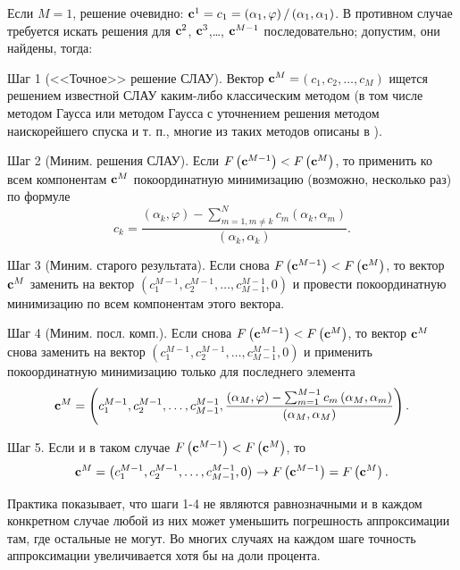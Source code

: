 \documentclass[a4paper]{article}
\begin{document}
Если $M=1$, решение очевидно: ${\bf c}^1=c_1=\left({\alpha }_1,\varphi \right)/\left({\alpha }_1,{\alpha }_1\right)$. В противном случае требуется искать решения для ${\bf c}^2$, ${\bf c}^3$,{\dots}, ${\bf c}^{M-1}$ последовательно; допустим, они найдены, тогда:

  Шаг 1 (<<Точное>> решение СЛАУ).
        Вектор ${\bf c}^M=$$\left(c_1,c_2,\dots ,c_M\right)$ ищется решением известной СЛАУ каким-либо классическим методом (в том числе методом Гаусса или методом Гаусса с уточнением решения методом наискорейшего спуска и т. п., многие из таких методов описаны в \cite{verzh1}).

        Шаг 2 (Миним. решения СЛАУ). Если $F\left({\bf c}^{M-1}\right)<F\left({\bf c}^M\right)$, то применить ко всем компонентам ${\bf c}^M$ покоординатную минимизацию (возможно, несколько раз) по формуле
        \begin{equation}
          c_k=\frac{\left({\alpha }_k,\varphi \right)-\sum^N_{m=1,m\neq k}{c_m}\left({\alpha }_k,{\alpha }_m\right)}{\left({\alpha }_k,{\alpha }_k\right)}.
        \end{equation}

  Шаг 3 (Миним. старого результата). Если снова $F\left({\bf c}^{M-1}\right)<F\left({\bf c}^M\right)$, то вектор ${\bf c}^M$ заменить на вектор $\left(c^{M-1}_1,c^{M-1}_2,\dots ,c^{M-1}_{M-1},0\right)$ и провести покоординатную минимизацию по всем компонентам этого вектора.

 Шаг 4 (Миним. посл. комп.). Если снова $F\left({\bf c}^{M-1}\right)<F\left({\bf c}^M\right)$, то вектор ${\bf c}^M$ снова заменить на вектор $\left(c^{M-1}_1,c^{M-1}_2,\dots ,c^{M-1}_{M-1},0\right)$ и применить покоординатную минимизацию только для последнего элемента
        \begin{equation}{\bf c}^M=\left(c^{M-1}_1,c^{M-1}_2,\dots ,c^{M-1}_{M-1},\frac{\left({\alpha }_M,\varphi \right)-\sum^{M-1}_{m=1}{c_m}\left({\alpha }_M,{\alpha }_m\right)}{\left({\alpha }_M,{\alpha }_M\right)}\right).\end{equation}

  Шаг 5. Если и в таком случае $F\left({\bf c}^{M-1}\right)<F\left({\bf c}^M\right)$, то
        \begin{equation}{\bf c}^M=\left(c^{M-1}_1,c^{M-1}_2,\dots ,c^{M-1}_{M-1},0\right)\to F\left({\bf c}^{M-1}\right)=F\left({\bf c}^M\right).\end{equation}

Практика показывает, что шаги 1-4 не являются равнозначными и в каждом конкретном случае любой из них может уменьшить погрешность аппроксимации там, где остальные не могут.
Во многих случаях на каждом шаге точность аппроксимации увеличивается хотя бы на доли процента.
\end{document}
